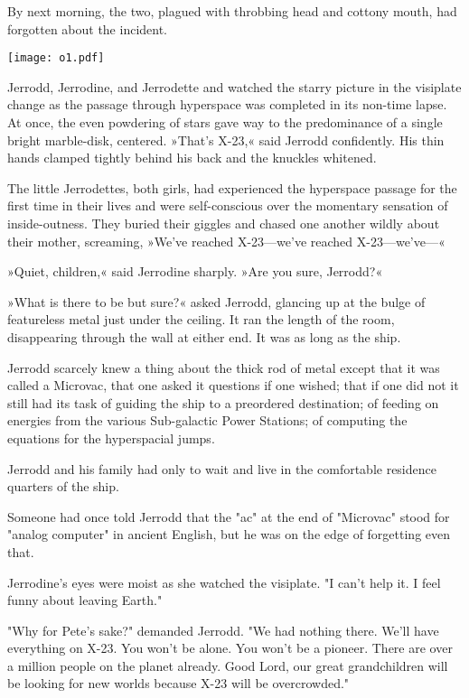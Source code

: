 \documentclass[11pt,twocolumn,paper=a5,pagesize]{article}
\newcommand{\q}[1]{»#1«}
\newcommand{\futureone}[1]{ #1 }
\newcommand{\sepa}[0]{\vspace{.6cm} {\centering 

\texttt{[image: o1.pdf]}

}\vspace{.6cm}}
\newcommand{\initial}[1]{ \lettrine[lines=3,lhang=0.3,nindent=0em]{  {\textsf{#1}}}{}}
\newcommand{\initialb}[1]{ \lettrine[lines=3,lhang=0.3,nindent=1em]{  {\textsf{#1}}}{}}
\begin{document}
By next morning, the two, plagued with throbbing head and cottony mouth, 
had forgotten about the incident.

\sepa{}

\futureone{
\initial{J}errodd, Jerrodine, and Jerrodette \MakeUppercase{\romannumeral 1}
and \MakeUppercase{\romannumeral 2} watched the starry picture in the 
visiplate change as the passage through hyperspace was completed in its 
non-time lapse. At once, the even powdering of stars gave way to the 
predominance of a single bright marble-disk, centered.
\q{That's X-23,} said Jerrodd confidently. His thin hands clamped tightly 
behind his back and the knuckles whitened.

The little Jerrodettes, both girls, had experienced the hyperspace passage 
for the first time in their lives and were self-conscious over the momentary 
sensation of inside-outness. They buried their giggles and chased one another 
wildly about their mother, screaming, \q{We've reached X-23---we've reached 
X-23---we've---}

\q{Quiet, children,} said Jerrodine sharply. \q{Are you sure, Jerrodd?}

\q{What is there to be but sure?} asked Jerrodd, glancing up at the bulge 
of featureless metal just under the ceiling. It ran the length of the room, 
disappearing through the wall at either end. It was as long as the ship.

Jerrodd scarcely knew a thing about the thick rod of metal except that it 
was called a Microvac, that one asked it questions if one wished; that if 
one did not it still had its task of guiding the ship to a preordered 
destination; of feeding on energies from the various Sub-galactic Power 
Stations; of computing the equations for the hyperspacial jumps.

Jerrodd and his family had only to wait and live in the comfortable residence 
quarters of the ship.

Someone had once told Jerrodd that the "ac" at the end of "Microvac" stood for "analog computer" in ancient English, but he was on the edge of forgetting even that.

Jerrodine's eyes were moist as she watched the visiplate. "I can't help it. I feel funny about leaving Earth."

"Why for Pete's sake?" demanded Jerrodd. "We had nothing there. We'll have everything on X-23. You won't be alone. You won't be a pioneer. There are over a million people on the planet already. Good Lord, our great grandchildren will be looking for new worlds because X-23 will be overcrowded."

}
\end{document}
